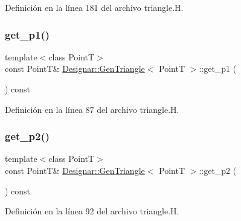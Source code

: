Definición en la línea 181 del archivo triangle.\+H.

\mbox{\label{class_designar_1_1_gen_triangle_ab697f342f213f563049c9f74fcee06a1}} 
\subsubsection{\texorpdfstring{get\+\_\+p1()}{get\_p1()}}
{\footnotesize\ttfamily template$<$class PointT$>$ \\
const PointT\& \hyperlink{class_designar_1_1_gen_triangle}{Designar\+::\+Gen\+Triangle}$<$ PointT $>$\+::get\+\_\+p1 (\begin{DoxyParamCaption}{ }\end{DoxyParamCaption}) const\hspace{0.3cm}{\ttfamily [inline]}}



Definición en la línea 87 del archivo triangle.\+H.

\mbox{\label{class_designar_1_1_gen_triangle_a77a549a6f5c67ab61298395606f920fa}} 
\subsubsection{\texorpdfstring{get\+\_\+p2()}{get\_p2()}}
{\footnotesize\ttfamily template$<$class PointT$>$ \\
const PointT\& \hyperlink{class_designar_1_1_gen_triangle}{Designar\+::\+Gen\+Triangle}$<$ PointT $>$\+::get\+\_\+p2 (\begin{DoxyParamCaption}{ }\end{DoxyParamCaption}) const\hspace{0.3cm}{\ttfamily [inline]}}



Definición en la línea 92 del archivo triangle.\+H.

\mbox{\label{class_designar_1_1_gen_triangle_a56dbe16bc096232f2bcc6f95c2e464df}} 
